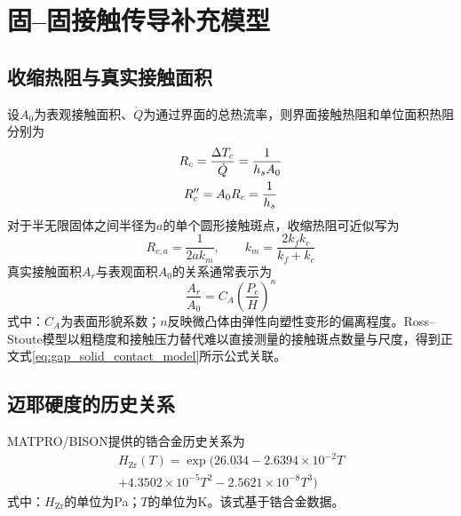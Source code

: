 \section{固--固接触传导补充模型}
\label{app:gap_contact_supplementary_models}

\subsection{收缩热阻与真实接触面积}

设$A_0$为表观接触面积、$\dot Q$为通过界面的总热流率，则界面接触热阻和单位面积热阻分别为
\begin{gather}
	R_c=\frac{\Delta T_c}{\dot Q}
	=\frac{1}{h_sA_0}
	\notag
	\\
	R_c''=A_0R_c=\frac{1}{h_s}
	\label{eq:appendix_gap_contact_resistance}
\end{gather}
对于半无限固体之间半径为$a$的单个圆形接触斑点，收缩热阻可近似写为
\begin{equation}
	R_{c,a}=\frac{1}{2ak_m},
	\qquad
	k_m=\frac{2k_fk_c}{k_f+k_c}
	\label{eq:appendix_gap_single_spot_resistance}
\end{equation}
真实接触面积$A_r$与表观面积$A_0$的关系通常表示为
\begin{equation}
	\frac{A_r}{A_0}
	=C_A\left(\frac{P_c}{H}\right)^n
	\label{eq:appendix_gap_real_contact_area}
\end{equation}
式中：$C_A$为表面形貌系数；$n$反映微凸体由弹性向塑性变形的偏离程度。Ross--Stoute模型以粗糙度和接触压力替代难以直接测量的接触斑点数量与尺度，得到正文式\eqref{eq:gap_solid_contact_model}所示公式关联。

\subsection{迈耶硬度的历史关系}

MATPRO/BISON提供的锆合金历史关系为\cite{hagrmanSCDAPRELAP5MOD1995,halesBISONTheoryManual2016}
\begin{equation}
	\begin{gathered}
		H_{\mathrm{Zr}}(T)
		=\exp\!\bigl(26.034
		-2.6394\times10^{-2}T
		\\
		+4.3502\times10^{-5}T^2
		-2.5621\times10^{-8}T^3\bigr)
	\end{gathered}
	\label{eq:appendix_gap_zircaloy_meyer_hardness}
\end{equation}
式中：$H_{\mathrm{Zr}}$的单位为Pa；$T$的单位为K。该式基于锆合金数据。


